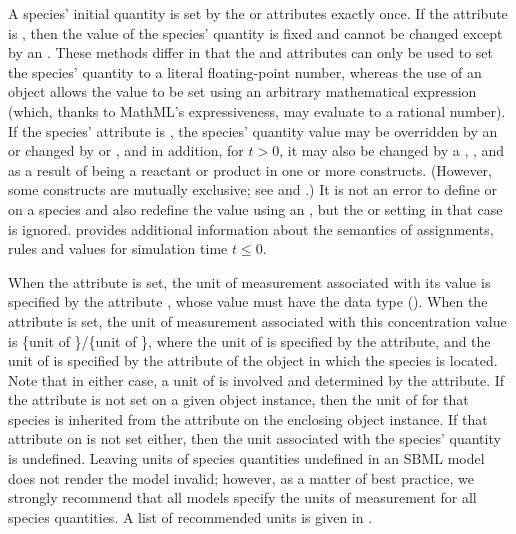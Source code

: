 A species' initial quantity is set by the  or
 attributes exactly once.  If the
 attribute is , then the value of the
species' quantity is fixed and cannot be changed except by an
\InitialAssignment.  These methods differ in that the
 and  attributes
can only be used to set the species' quantity to a literal
floating-point number, whereas the use of an \InitialAssignment
object allows the value to be set using an arbitrary mathematical
expression (which, thanks to MathML's expressiveness, may evaluate
to a rational number).  If the species'  attribute
is , the species' quantity value may be overridden by
an \InitialAssignment or changed by \AssignmentRule or
\AlgebraicRule, and in addition, for $t > 0$, it may also be
changed by a \RateRule, \Event, and as a result of being a
reactant or product in one or more \Reaction constructs.  (However, some
constructs are mutually exclusive; see 
and .)  It is not an error to define
 or  on a species
and also redefine the value using an \InitialAssignment, but the
 or  setting in
that case is ignored.   provides
additional information about the semantics of assignments, rules
and values for simulation time $t \leq 0$.

When the attribute  is set, the unit of
measurement associated with its value is specified by the \Species
attribute , whose value must have the data
type  ().  When
the  attribute is set, the unit of
measurement associated with this concentration value is \{unit of
\}/\{unit of \}, where the unit
of  is specified by the \Species
{} attribute, and the unit of
 is specified by the  attribute of
the \Compartment object in which the species is located.  Note
that in either case, a unit of  is involved and
determined by the  attribute.  If the
 attribute is not set on a given \Species
object instance, then the unit of  for that
species is inherited from the  attribute on
the enclosing \Model object instance.  If that attribute on \Model
is not set either, then the unit associated with the species'
quantity is undefined.  Leaving units of species quantities
undefined in an SBML model does not render the model invalid;
however, as a matter of best practice, we strongly recommend that
all models specify the units of measurement for all species
quantities.  A list of recommended units is given in
.

